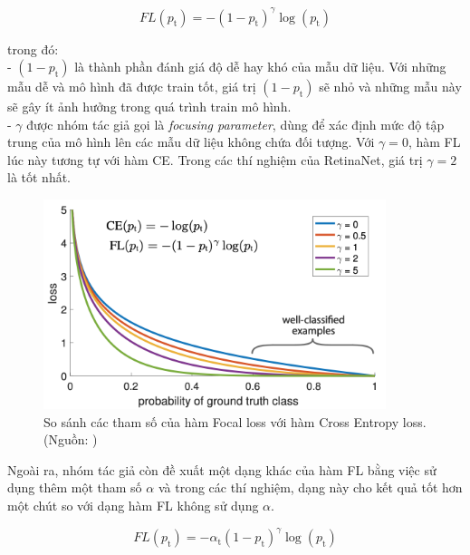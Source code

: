 {    \begin{equation}
        FL(p_\textrm{t}) = - (1 - p_\textrm{t})^\gamma \log (p_\textrm{t})
    \end{equation}

    \noindent
    trong đó: \\
    - $(1 - p_\textrm{t})$ là thành phần đánh giá độ dễ hay khó của mẫu dữ liệu.
    Với những mẫu dễ và mô hình đã được train tốt, giá trị $(1 - p_\textrm{t})$ sẽ nhỏ và những mẫu này sẽ gây ít ảnh hưởng trong quá trình train mô hình. \\
    - $\gamma$ được nhóm tác giả gọi là \textit{focusing parameter}, dùng để xác định mức độ tập trung của mô hình lên các mẫu dữ liệu không chứa đối tượng.
    Với $\gamma = 0$, hàm FL lúc này tương tự với hàm CE.
    Trong các thí nghiệm của RetinaNet, giá trị $\gamma = 2$ là tốt nhất.

    \begin{figure}[H]
        \centering
        \includegraphics[width=10cm] {images/retinanet_focal_loss_curve}
        \caption{So sánh các tham số của hàm Focal loss  với hàm Cross Entropy loss. (Nguồn: \cite{lin2017focal})}
        \label{fig:retinanet_focal_loss_curve}
    \end{figure}

    \noindent
    Ngoài ra, nhóm tác giả còn đề xuất một dạng khác của hàm FL bằng việc sử dụng thêm một tham số $\alpha$ và trong các thí nghiệm, dạng này cho kết quả tốt hơn một chút so với dạng hàm FL không sử dụng $\alpha$.

    \begin{equation}
        FL(p_\textrm{t}) = - \alpha_\textrm{t} (1 - p_\textrm{t})^\gamma \log (p_\textrm{t})
    \end{equation}
    
}
